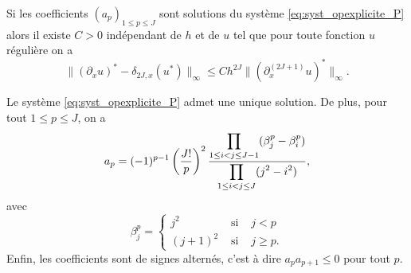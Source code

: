 \begin{corollaire}
Si les coefficients $(a_p)_{1 \leq p \leq J}$ sont solutions du système \eqref{eq:syst_opexplicite_P} alors il existe $C>0$ indépendant de $h$ et de $u$ tel que pour toute fonction $u$ régulière on a 
\begin{equation}
\| (\partial_x u)^* - \delta_{2J,x}(u^*) \|_{\infty} \leq C h^{2J} \| (\partial^{(2J+1)}_x u)^* \|_{\infty}.
\end{equation} 
\end{corollaire}

\begin{proposition}
Le système \eqref{eq:syst_opexplicite_P} admet une unique solution. De plus, pour tout $1 \leq p \leq J$, on a
\begin{equation}
a_p = (-1)^{p-1} \left( \dfrac{J!}{p} \right)^2 \dfrac{\displaystyle\prod\limits_{1 \leq i <j \leq J-1}(\beta_j^p - \beta_i^p)}{\displaystyle\prod\limits_{1 \leq i <j \leq J}(j^2 - i^2)},
\end{equation}
avec 
\begin{equation}
\beta^p_j = \left\lbrace
\begin{array}{ccl}
j^2 & \text{ si } & j<p \\
(j+1)^2 & \text{ si } & j \geq p.
\end{array}
\right.
\end{equation}
Enfin, les coefficients sont de signes alternés, c'est à dire $a_p a_{p+1} \leq 0$ pour tout $p$.
\end{proposition}


